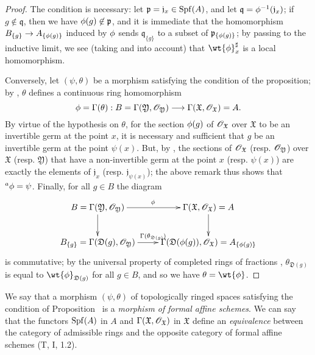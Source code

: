 \begin{proof}
\label{proof-1.10.2.2}
The condition is necessary: let $\mathfrak{p}=\mathfrak{j}_x\in\operatorname{Spf}(A)$, and let $\mathfrak{q}=\phi^{-1}(\mathfrak{j}_x)$; if $g\not\in\mathfrak{q}$, then we have $\phi(g)\not\in\mathfrak{p}$, and it is immediate that the homomorphism
$B_{\{g\}}\to A_{\{\vphi(g)\}}$ induced by $\phi$  sends $\mathfrak{q}_{\{g\}}$ to a subset of $\mathfrak{p}_{\{\phi(g)\}}$; by passing to the inductive limit, we see (taking  and  into account) that $\wt{\vphi}_x^\sharp$ is a local homomorphism.

Conversely, let $(\psi,\theta)$ be a morphism satisfying the condition of the proposition;
by , $\theta$ defines a continuous ring homomorphism
\[
  \vphi=\Gamma(\theta):B=\Gamma(\mathfrak{Y},\sh{O}_\mathfrak{Y})\to\Gamma(\mathfrak{X},\sh{O}_\mathfrak{X})=A.
\]
By virtue of the hypothesis on $\theta$, for the section $\phi(g)$ of $\mathscr{O}_\mathfrak{X}$ over $\mathfrak{X}$ to be an invertible germ at the point $x$, it is necessary and sufficient that $g$ be an invertible germ at the point $\psi(x)$.
But, by , the sections of $\mathscr{O}_\mathfrak{X}$ (resp. $\mathscr{O}_\mathfrak{Y}$) over $\mathfrak{X}$ (resp. $\mathfrak{Y}$) that have a non-invertible germ at the point $x$ (resp. $\psi(x)$) are exactly the elements of $\mathfrak{j}_x$
(resp. $\mathfrak{j}_{\psi(x)}$);
the above remark thus shows that ${}^a\phi=\psi$.
Finally, for all $g\in B$ the diagram
\[
  \xymatrix{
    B=\Gamma(\mathfrak{Y},\sh{O}_\mathfrak{Y})\ar[r]^\vphi\ar[d] &
    \Gamma(\mathfrak{X},\sh{O}_\mathfrak{X})=A\ar[d]\\
    B_{\{g\}}=\Gamma(\mathfrak{D}(g),\sh{O}_\mathfrak{Y})\ar[r]^{\Gamma(\theta_{\mathfrak{D}(g)})} &
    \Gamma(\mathfrak{D}(\vphi(g)),\sh{O}_\mathfrak{X})=A_{\{\vphi(g)\}}
  }
\]
is commutative; by the universal property of completed rings of fractions , $\theta_{\mathfrak{D}(g)}$ is equal to $\wt{\vphi}_{\mathfrak{D}(g)}$ for all $g\in B$, and so  we have $\theta=\wt{\vphi}$.
\end{proof}

We say that a morphism $(\psi,\theta)$ of topologically ringed spaces satisfying the condition of Proposition~ is a \emph{morphism of formal affine schemes}.
We can say that the functors $\operatorname{Spf}(A)$ in $A$ and $\Gamma(\mathfrak{X},\mathscr{O}_\mathfrak{X})$ in $\mathfrak{X}$ define an \emph{equivalence} between the category of admissible rings and the opposite category of formal affine schemes (T, I, 1.2).

